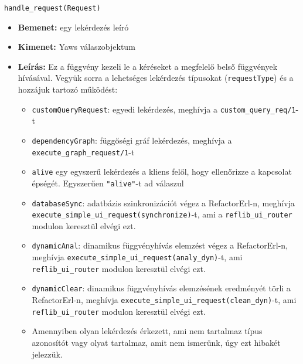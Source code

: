 \noindent \lstinline{handle_request(Request)}
\begin{itemize}
    \item \textbf{Bemenet:} egy lekérdezés leíró
    \item \textbf{Kimenet:} Yaws válaszobjektum
    \item \textbf{Leírás:} Ez a függvény kezeli le a kéréseket a megfelelő belső függvények hívásával. Vegyük sorra a lehetséges lekérdezés típusokat (\lstinline{requestType}) és a hozzájuk tartozó működést:
    \begin{itemize}
        \item \lstinline{customQueryRequest}: egyedi lekérdezés, meghívja a \lstinline{custom_query_req/1}-t
        
        \item \lstinline{dependencyGraph}: függőségi gráf lekérdezés, meghívja a \lstinline{execute_graph_request/1}-t
        
        \item \lstinline{alive}  egy egyszerű lekérdezés a kliens felől, hogy ellenőrizze a kapcsolat épségét. Egyszerűen \lstinline{"alive"}-t ad válaszul
        
        \item \lstinline{databaseSync}: adatbázis szinkronizációt végez a RefactorErl-n, meghívja \lstinline|execute_simple_ui_request(synchronize)|-t, ami a \lstinline{reflib_ui_router} modulon keresztül elvégi ezt.
        
        \item \lstinline{dynamicAnal}: dinamikus függvényhívás elemzést végez a RefactorErl-n, meghívja \lstinline|execute_simple_ui_request(analy_dyn)|-t, ami \lstinline{reflib_ui_router} modulon keresztül elvégi ezt.
        
        \item \lstinline{dynamicClear}: dinamikus függvényhívás elemzésének eredményét törli a RefactorErl-n, meghívja \lstinline|execute_simple_ui_request(clean_dyn)|-t, ami \lstinline{reflib_ui_router} modulon keresztül elvégi ezt.
        
        \item Amennyiben olyan lekérdezés érkezett, ami nem tartalmaz típus azonosítót vagy olyat tartalmaz, amit nem ismerünk, úgy ezt hibakét jelezzük.
        
    \end{itemize}
\end{itemize} 



